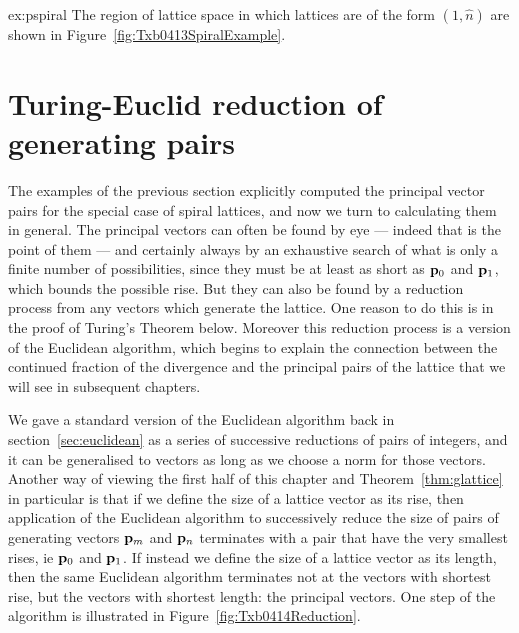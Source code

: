 \begin{jAnswer}{ex:pspiral}
{The region of lattice space in which lattices are of the form $(1,\hat{n})$ are shown in Figure~\ref{fig:Txb0413SpiralExample}.
}
\end{jAnswer}
 

\section{Turing-Euclid reduction of generating pairs}
\label{sec:TEreduction}
The examples of the previous section explicitly computed the principal vector pairs for the special case of spiral lattices, and now we turn to calculating them in 
general. 
The principal vectors can often be found by eye --- indeed that is the point of them --- and certainly always by an exhaustive search of what is only a finite number of possibilities, since they must be at least as short as ${\mathbf p}_{0}$ and ${\mathbf p}_{1}$, which bounds the possible rise.
But they can also be found by a reduction process from any vectors which generate the lattice. One reason to do this is in the proof of Turing's Theorem below. Moreover this reduction process is a version of the Euclidean algorithm, which begins to explain the connection between the continued fraction of the divergence and the principal pairs of the lattice that we will see in subsequent chapters. 

We gave a standard version of the Euclidean algorithm back in section~\eqref{sec:euclidean} as a series of successive reductions of pairs of integers, and it can be generalised to vectors as long as we choose a norm for those vectors. Another way of viewing the first half of this chapter and Theorem~\ref{thm:glattice} in particular is that 
if we define the size of a lattice vector as its rise, then application of the Euclidean algorithm to successively reduce the size of pairs of generating  vectors ${\mathbf p}_{m}$ and ${\mathbf p}_{n}$  terminates with a pair that have the very smallest rises, ie ${\mathbf p}_{0}$ and ${\mathbf p}_{1}$. If instead we define the size of a lattice vector as its length, then the same Euclidean algorithm terminates not at the vectors with shortest rise, but the vectors with shortest length: the principal vectors. One step of the algorithm is illustrated in Figure~\ref{fig:Txb0414Reduction}.


